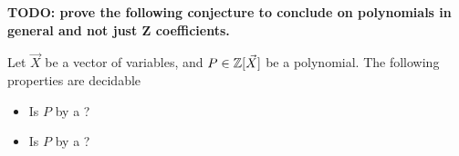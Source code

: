 \textbf{TODO: prove the following conjecture to conclude on polynomials in general
and not just Z coefficients.}
\begin{conjecture}
    Let $\vec{X}$ be a vector of variables, and $P \in \mathbb{Z}[\vec{X}]$ be a
    polynomial. The following properties are decidable
    \begin{itemize}
        \item Is $P$  by a ?
        \item Is $P$  by a ?
    \end{itemize}
\end{conjecture}
